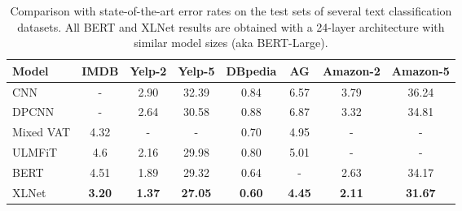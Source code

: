 \documentclass{article}
\begin{document}
\begin{table}[!h]
  \small
  \centering
  
  \begin{tabular}{lccccccc}
    \toprule
    \bf Model & \bf IMDB & \bf Yelp-2& \bf Yelp-5 & \bf DBpedia & \bf AG & \bf Amazon-2 & \bf Amazon-5 \\
    \midrule
    CNN \cite{johnson2017deep} & - & 2.90 & 32.39 & 0.84 & 6.57 & 3.79 & 36.24 \\
    DPCNN \cite{johnson2017deep} & - & 2.64 & 30.58 & 0.88 & 6.87 & 3.32 & 34.81 \\
    Mixed VAT \cite{sachan2018revisiting,miyato2016adversarial} & 4.32 & - & - & 0.70 & 4.95 & - & - \\
    ULMFiT \cite{howard2018universal} & 4.6 & 2.16 & 29.98 & 0.80 & 5.01 & - & - \\
    BERT \cite{uda2019} & 4.51 & 1.89 & 29.32 & 0.64 & - & 2.63 & 34.17 \\
    \midrule
    XLNet & \bf 3.20 & \bf 1.37 & \bf 27.05 & \bf 0.60 & \bf 4.45 & \bf 2.11 & \bf 31.67 \\
    \bottomrule
  \end{tabular}
  \caption{\small
    Comparison with state-of-the-art error rates on the test sets of several text classification datasets. All BERT and XLNet results are obtained with a 24-layer architecture with similar model sizes (aka BERT-Large).
  }
  \label{tab:txtcls}
\end{table}
\end{document}
